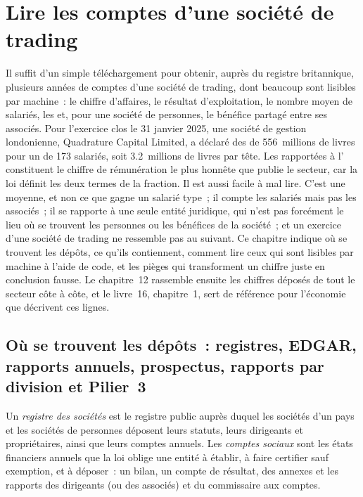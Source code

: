 \chapter{Lire les comptes d'une société de trading}\label{ch:in:reading-a-trading-firms-accounts}

Il suffit d'un simple téléchargement pour obtenir, auprès du registre britannique, plusieurs années de comptes d'une société de trading, dont beaucoup sont lisibles par machine~:
le chiffre d'affaires, le résultat d'exploitation, le nombre moyen de salariés, les  et, pour une société de personnes, le bénéfice partagé entre
ses associés. Pour l'exercice clos le 31 janvier 2025, une société de gestion londonienne, Quadrature Capital Limited, a déclaré des 
de 556~millions de livres pour un  de 173 salariés, soit 3.2~millions de livres par tête. Les  rapportées à l' constituent
le chiffre de rémunération le plus honnête que publie le secteur, car la loi définit les deux termes de la fraction. Il est aussi
facile à mal lire. C'est une moyenne, et non ce que gagne un salarié type~; il compte les salariés mais pas les associés~; il se rapporte à
une seule entité juridique, qui n'est pas forcément le lieu où se trouvent les personnes ou les bénéfices de la société~; et un exercice d'une société de trading ne ressemble pas au
suivant. Ce chapitre indique où se trouvent les dépôts, ce qu'ils contiennent, comment lire ceux qui sont lisibles par machine à l'aide de code,
et les pièges qui transforment un chiffre juste en conclusion fausse. Le chapitre~12 rassemble ensuite les chiffres déposés de tout le secteur
côte à côte, et le livre~16, chapitre~1, sert de référence pour l'économie que décrivent ces lignes.

\section{Où se trouvent les dépôts~: registres, EDGAR, rapports annuels, prospectus, rapports par division et Pilier~3}

\begin{definition}\label{def:in:reading-a-trading-firms-accounts:registry}
Un \emph{registre des sociétés} est le registre public auprès duquel les sociétés d'un pays et
les sociétés de personnes déposent leurs statuts, leurs dirigeants et propriétaires, ainsi que leurs comptes annuels. Les \emph{comptes sociaux}
sont les états financiers annuels que la loi oblige une entité à établir,
à faire certifier sauf exemption, et à déposer~: un bilan, un compte de résultat, des annexes et les rapports
des dirigeants (ou des associés) et du commissaire aux comptes.
\end{definition}


